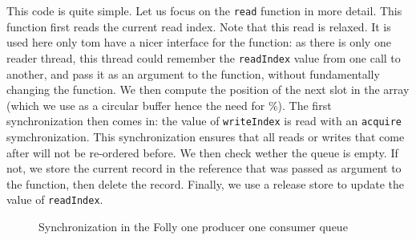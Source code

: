 This code is quite simple. Let us focus on the \texttt{read} function in more detail. This function first reads the current read index. Note that this read is relaxed. It is used here only tom have a nicer interface for the function: as there is only one reader thread, this thread could remember the \texttt{readIndex} value from one call to another, and pass it as an argument to the function, without fundamentally changing the function. We then compute the position of the next slot in the array (which we use as a circular buffer hence the need for \%). The first synchronization then comes in: the value of \texttt{writeIndex} is read with an \texttt{acquire} symchronization. This synchronization ensures that all reads or writes that come after will not be re-ordered before. We then check wether the queue is empty. If not, we store the current record in the reference that was passed as argument to the function, then delete the record. Finally, we use a release store to update the value of \texttt{readIndex}.

\begin{figure}
		\begin{center}
\end{center}
\label{fig:synchQueue}
\caption{Synchronization in the Folly one producer one consumer queue}
\end{figure}


